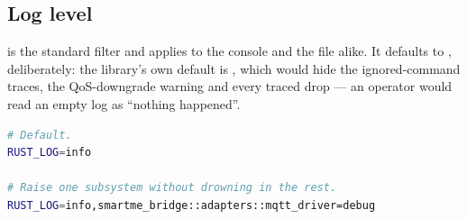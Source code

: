 \subsection{Log level}

 is the standard  filter and applies to the console and the
file alike. It defaults to , deliberately: the library's own default is
, which would hide the ignored-command traces, the QoS-downgrade warning and
every traced drop --- an operator would read an empty log as ``nothing happened''.

\begin{lstlisting}[language=bash]
# Default.
RUST_LOG=info

# Raise one subsystem without drowning in the rest.
RUST_LOG=info,smartme_bridge::adapters::mqtt_driver=debug
\end{lstlisting}
